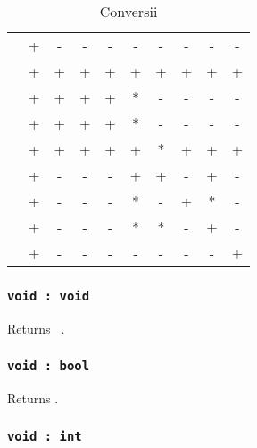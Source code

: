\begin{table}[htb]
	\caption{Conversii}
	\label{castingtable}
	\begin{tabular}{|l|c|c|c|c|c|c|c|c|c|}
		\hline
		          & \void & \bool & \integer & \double & \str & \listtype & \object & \set & \element \\ \hline
		\void     & +     & -     & -        & -       & -    & -         & -       & -    & -        \\ \hline
		\bool     & +     & +     & +        & +       & +    & +         & +       & +    & +        \\ \hline
		\integer  & +     & +     & +        & +       & *    & -         & -       & -    & -        \\ \hline
		\double   & +     & +     & +        & +       & *    & -         & -       & -    & -        \\ \hline
		\str      & +     & +     & +        & +       & +    & *         & +       & +    & +        \\ \hline
		\listtype & +     & -     & -        & -       & +    & +         & -       & +    & -        \\ \hline
		\object   & +     & -     & -        & -       & *    & -         & +       & *    & -        \\ \hline
		\set      & +     & -     & -        & -       & *    & *         & -       & +    & -        \\ \hline
		\element  & +     & -     & -        & -       & -    & -         & -       & -    & +        \\ \hline
	\end{tabular}
\end{table}

\subsubsection{\texttt{void : void}}

Returns \texttt{~}.

\subsubsection{\texttt{void : bool}}

Returns \false.

\subsubsection{\texttt{void : int}}

